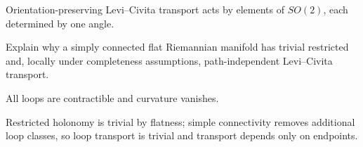 \begin{solution}
Orientation-preserving Levi--Civita transport acts by elements of \(SO(2)\), each determined by one angle.
\end{solution}

\begin{exercise}\label{exr:vii25-ped-16}
Explain why a simply connected flat Riemannian manifold has trivial restricted and, locally under completeness assumptions, path-independent Levi--Civita transport.
\end{exercise}

\begin{hint}
All loops are contractible and curvature vanishes.
\end{hint}

\begin{solution}
Restricted holonomy is trivial by flatness; simple connectivity removes additional loop classes, so loop transport is trivial and transport depends only on endpoints.
\end{solution}

